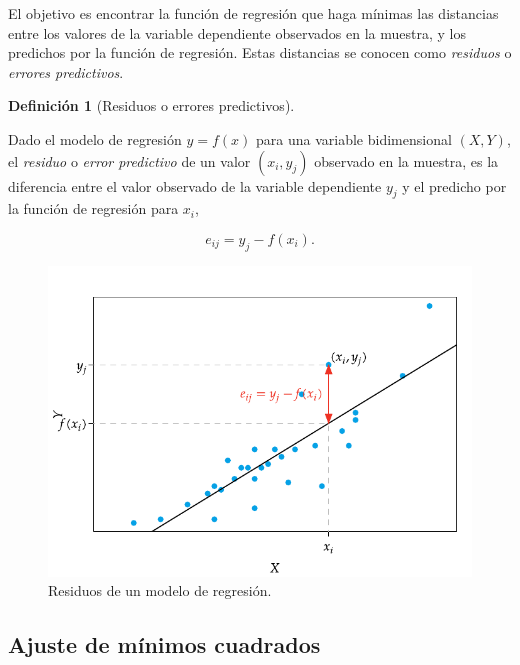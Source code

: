 \documentclass[
  a4paper,
]{scrreport}
\theoremstyle{plain}
\theoremstyle{definition}
\theoremstyle{definition}
\newtheorem{definition}{Definición}[chapter]
\theoremstyle{remark}
\begin{document}
El objetivo es encontrar la función de regresión que haga mínimas las
distancias entre los valores de la variable dependiente observados en la
muestra, y los predichos por la función de regresión. Estas distancias
se conocen como \emph{residuos} o \emph{errores predictivos}.

\begin{definition}[Residuos o errores
predictivos]\protect\hypertarget{def-resiudos}{}\label{def-resiudos}

Dado el modelo de regresión \(y=f(x)\) para una variable bidimensional
\((X,Y)\), el \emph{residuo} o \emph{error predictivo} de un valor
\((x_i,y_j)\) observado en la muestra, es la diferencia entre el valor
observado de la variable dependiente \(y_j\) y el predicho por la
función de regresión para \(x_i\),

\[e_{ij} = y_j-f(x_i).\]

\end{definition}

\begin{figure}[H]

{\centering \includegraphics{img/regresion/residuos_y.pdf}

}

\caption{Residuos de un modelo de regresión.}

\end{figure}%

\subsection{Ajuste de mínimos
cuadrados}\label{ajuste-de-muxednimos-cuadrados}
\end{document}
